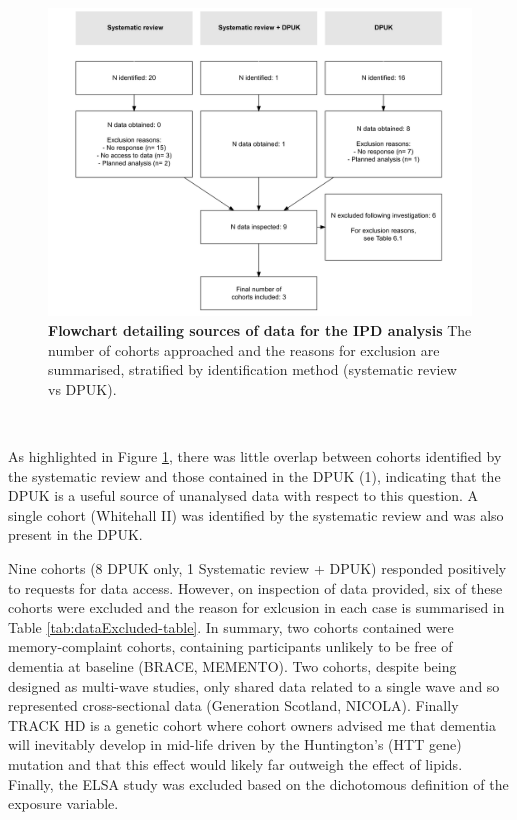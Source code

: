 \documentclass[a4paper, twoside]{templates/ociamthesis}
\begin{document}
~





\begin{figure}[H]
\includegraphics[width=1\linewidth]{figures/ipd/cohortFlowchart} \caption[Flowchart detailing sources of data for the IPD analysis]{\textbf{Flowchart detailing sources of data for the IPD analysis} The number of cohorts approached and the reasons for exclusion are summarised, stratified by identification method (systematic review vs DPUK).}\label{fig:cohortFlowchart}
\end{figure}

~

As highlighted in Figure \ref{fig:cohortFlowchart}, there was little overlap between cohorts identified by the systematic review and those contained in the DPUK (1), indicating that the DPUK is a useful source of unanalysed data with respect to this question. A single cohort (Whitehall II) was identified by the systematic review and was also present in the DPUK.

Nine cohorts (8 DPUK only, 1 Systematic review + DPUK) responded positively to requests for data access. However, on inspection of data provided, six of these cohorts were excluded and the reason for exlcusion in each case is summarised in Table \ref{tab:dataExcluded-table}. In summary, two cohorts contained were memory-complaint cohorts, containing participants unlikely to be free of dementia at baseline (BRACE, MEMENTO). Two cohorts, despite being designed as multi-wave studies, only shared data related to a single wave and so represented cross-sectional data (Generation Scotland, NICOLA). Finally TRACK HD is a genetic cohort where cohort owners advised me that dementia will inevitably develop in mid-life driven by the Huntington's (HTT gene) mutation and that this effect would likely far outweigh the effect of lipids. Finally, the ELSA study was excluded based on the dichotomous definition of the exposure variable.
\end{document}
